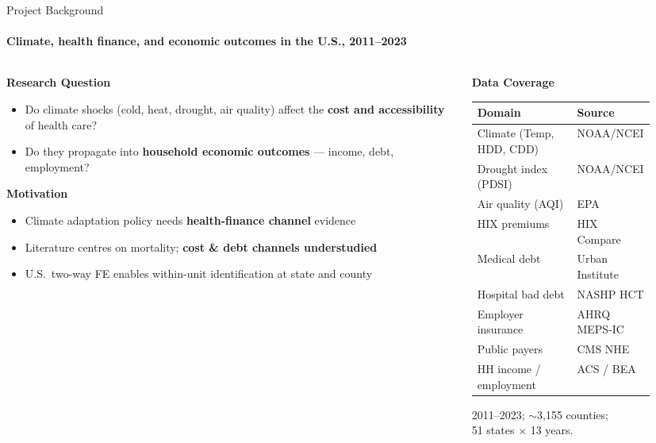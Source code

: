 \documentclass[aspectratio=169,11pt]{beamer}
\newcommand{\emphcolor}[1]{{\color{WarmOrange}\textbf{#1}}}
\newcommand{\tealtext}[1]{{\color{Teal}#1}}
\newcommand{\graytext}[1]{{\color{WarmGray}#1}}
\begin{document}
\begin{frame}{Project Background}
  \framesubtitle{Climate, health finance, and economic outcomes in the U.S., 2011--2023}
  \begin{columns}[T]
    \begin{column}{0.47\textwidth}
      \footnotesize
      \textbf{\tealtext{Research Question}}
      \begin{itemize}\itemsep0.15em
        \item Do climate shocks (cold, heat, drought, air quality) affect the \emphcolor{cost and accessibility} of health care?
        \item Do they propagate into \emphcolor{household economic outcomes} --- income, debt, employment?
      \end{itemize}
      \vspace{0.15em}
      \textbf{\tealtext{Motivation}}
      \begin{itemize}\itemsep0.15em
        \item Climate adaptation policy needs \emphcolor{health-finance channel} evidence
        \item Literature centres on mortality; \emphcolor{cost \& debt channels understudied}
        \item U.S.\ two-way FE enables within-unit identification at state and county
      \end{itemize}
    \end{column}
    \begin{column}{0.47\textwidth}
      \textbf{\tealtext{Data Coverage}}\\[0.3em]
      \scriptsize
      \begin{tabular}{@{}>{\raggedright\arraybackslash}p{0.56\linewidth}>{\raggedright\arraybackslash}p{0.26\linewidth}@{}}
        \toprule
        Domain & Source \\
        \midrule
        Climate (Temp, HDD, CDD) & NOAA/NCEI \\
        Drought index (PDSI)     & NOAA/NCEI \\
        Air quality (AQI)        & EPA \\
        HIX premiums             & HIX Compare \\
        Medical debt             & Urban Institute \\
        Hospital bad debt        & NASHP HCT \\
        Employer insurance       & AHRQ MEPS-IC \\
        Public payers            & CMS NHE \\
        HH income / employment   & ACS / BEA \\
        \bottomrule
      \end{tabular}
      \vspace{0.25em}
      \graytext{\scriptsize 2011--2023; $\sim$3{,}155 counties;\\ 51 states $\times$ 13 years.}
    \end{column}
  \end{columns}
\end{frame}
\end{document}
